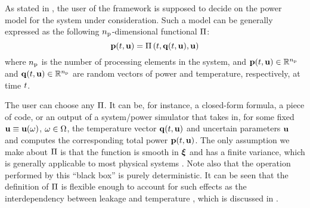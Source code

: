 As stated in , the user of the framework is supposed to decide on the power model for the system under consideration.
Such a model can be generally expressed as the following ${n_\text{p}}$-dimensional functional $\oPower$:
\begin{equation} \elabel{power-model}
  \vP(\t, \vU) = \oPower{\t, \vTO(\t, \vU), \vU}
\end{equation}
where ${n_\text{p}}$ is the number of processing elements in the system, and $\mathbf{p}(t, \mathbf{u}) \in \mathbb{R}^{n_\text{p}}$ and $\mathbf{q}(t, \mathbf{u}) \in \mathbb{R}^{n_\text{p}}$ are random vectors of power and temperature, respectively, at time $t$.

The user can choose any $\oPower$.
It can be, for instance, a closed-form formula, a piece of code, or an output of a system/power simulator that takes in, for some fixed $\mathbf{u} \equiv \mathbf{u}(\omega)$, $\omega \in \Omega$, the temperature vector $\mathbf{q}(t, \mathbf{u})$ and uncertain parameters $\mathbf{u}$ and computes the corresponding total power $\mathbf{p}(t, \mathbf{u})$.
The only assumption we make about $\oPower$ is that the function is smooth in $\boldsymbol{\xi}$ and has a finite variance, which is generally applicable to most physical systems \cite{xiu2010}.
Note also that the operation performed by this ``black box'' is purely deterministic.
It can be seen that the definition of $\oPower$ is flexible enough to account for such effects as the interdependency between leakage and temperature \cite{srivastava2010, liu2007}, which is discussed in .

